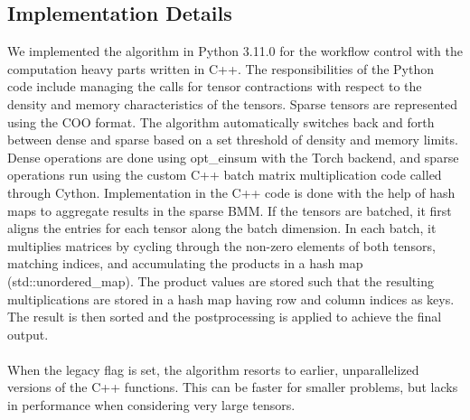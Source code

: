 \subsection{Implementation Details}
We implemented the algorithm in Python 3.11.0 for the workflow control with the computation heavy
parts written in C++. The responsibilities of the Python code include managing the calls for
tensor contractions with respect to the density and memory characteristics of the tensors. Sparse
tensors are represented using the COO format. The algorithm automatically switches back and forth
between dense and sparse based on a set threshold of density and memory limits. Dense operations
are done using opt\_einsum with the Torch backend, and sparse operations run using the custom
C++ batch matrix multiplication code called through Cython. Implementation in the C++ code is
done with the help of hash maps to aggregate results in the sparse BMM. If the tensors are batched,
it first aligns the entries for each tensor along the batch dimension. In each batch, it multiplies
matrices by cycling through the non-zero elements of both tensors, matching indices, and accumulating
the products in a hash map (std::unordered\_map). The product values are stored such that the
resulting multiplications are stored in a hash map having row and column indices as keys. The result
is then sorted and the postprocessing is applied to achieve the final output.
\\
\\
When the legacy flag is set, the algorithm resorts to earlier, unparallelized versions of the C++
functions. This can be faster for smaller problems, but lacks in performance when considering very large
tensors.